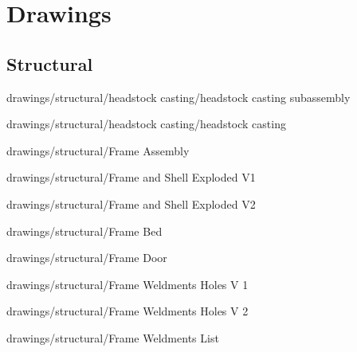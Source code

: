 \chapter{Drawings}

\section{Structural}


            {drawings/structural/headstock casting/headstock casting subassembly}


            {drawings/structural/headstock casting/headstock casting}


            {drawings/structural/Frame Assembly}


            {drawings/structural/Frame and Shell Exploded V1}


            {drawings/structural/Frame and Shell Exploded V2}


            {drawings/structural/Frame Bed}


            {drawings/structural/Frame Door}


            {drawings/structural/Frame Weldments Holes V 1}


            {drawings/structural/Frame Weldments Holes V 2}


            {drawings/structural/Frame Weldments List}

